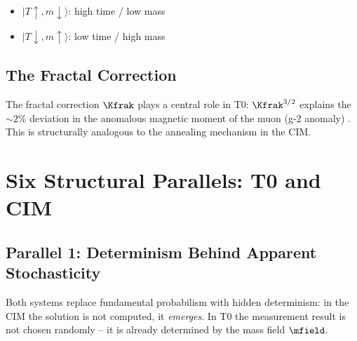 \begin{itemize}
    \item $|T{\uparrow}, m{\downarrow}\rangle$: high time / low mass
    \item $|T{\downarrow}, m{\uparrow}\rangle$: low time / high mass
\end{itemize}

\subsection{The Fractal Correction}

The fractal correction $\Kfrak$ plays a central role in T0:
$\Kfrak^{3/2}$ explains the $\sim 2\%$ deviation in the anomalous magnetic
moment of the muon (g-2 anomaly) \cite{pascher_g2_2025}. This is structurally
analogous to the annealing mechanism in the CIM.

\clearpage

\section{Six Structural Parallels: T0 and CIM}
\label{sec:parallels}

\subsection{Parallel 1: Determinism Behind Apparent Stochasticity}

\begin{table}[h]
    \centering
    \caption{Parallel 1: Determinism}
    \label{tab:parallel1}
\end{table}

Both systems replace fundamental probabilism with hidden determinism:
in the CIM the solution is not computed, it \emph{emerges}.
In T0 the measurement result is not chosen randomly -- it is already determined
by the mass field $\mfield$.

